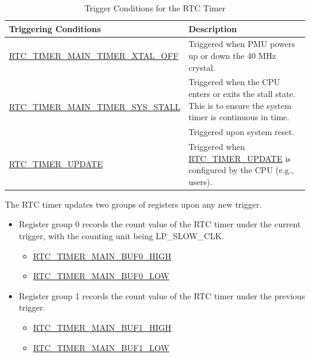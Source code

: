 \documentclass[main\_\_EN.tex]{subfiles}
\begin{document}
\begin{longtable}[c]{|p{6cm}|p{9cm}|}
    \caption{Trigger Conditions for the RTC Timer} \label{tab:lowpowm-Update-RTC-TIMER-VALUE}
    \\\hline
    \rowcolor{lightgray}
    \textbf{Triggering Conditions} & \textbf{Description} \\
    \hline
    \hyperref[fielddesc:RTCTIMERMAINTIMERXTALOFF]{RTC\_TIMER\_MAIN\_TIMER\_XTAL\_OFF} & Triggered when PMU powers up or down the 40 MHz crystal.\\
    \hline
    \multirow{2}{*}{\hyperref[fielddesc:RTCTIMERMAINTIMERSYSSTALL]{RTC\_TIMER\_MAIN\_TIMER\_SYS\_STALL}} & Triggered when the CPU enters or exits the stall state. This is to ensure the system timer is continuous in time. \\
    \hline
    \hyperref[fielddesc:RTCTIMERMAINTIMERSYSRST]{RTC\_TIMER\_MAIN\_TIMER\_SYS\_RST} & Triggered upon system reset.\\
    \hline

    \multirow{2}{*}{\hyperref[fielddesc:RTCTIMERUPDATE]{RTC\_TIMER\_UPDATE}} & Triggered when \hyperref[fielddesc:RTCTIMERUPDATE]{RTC\_TIMER\_UPDATE} is configured by the CPU (e.g., users).\\
    \hline
\end{longtable}

The RTC timer updates two groups of registers upon any new trigger.

\begin{itemize}
    \item Register group 0 records the count value of the RTC timer under the current trigger, with the counting unit being LP\_SLOW\_CLK.
    \begin{itemize}
        \item \hyperref[fielddesc:RTCTIMERMAINBUF0HIGH]{RTC\_TIMER\_MAIN\_BUF0\_HIGH}
        \item \hyperref[fielddesc:RTCTIMERMAINBUF0LOW]{RTC\_TIMER\_MAIN\_BUF0\_LOW}
    \end{itemize}
    \item Register group 1 records the count value of the RTC timer under the previous trigger.
    \begin{itemize}
    \item \hyperref[fielddesc:RTCTIMERMAINBUF1HIGH]{RTC\_TIMER\_MAIN\_BUF1\_HIGH}
    \item \hyperref[fielddesc:RTCTIMERMAINBUF1LOW]{RTC\_TIMER\_MAIN\_BUF1\_LOW}
    \end{itemize}
\end{itemize}
\end{document}
